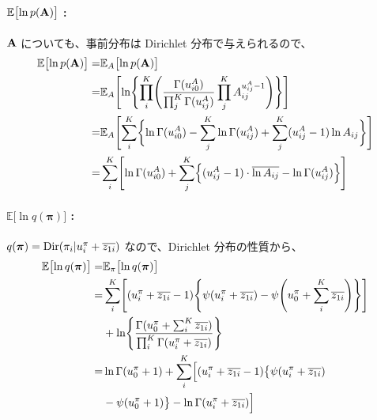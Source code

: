 \paragraph{ $\mathbb{E}\bigl[\ln p({\bf A}) \bigr]$ : }
${\bf A}$ についても、事前分布は Dirichlet 分布で与えられるので、
\begin{align}
  \mathbb{E}\bigl[\ln p({\bf A}) \bigr]  =&  \mathbb{E}_{A}\bigl[ \ln p({\bf A}) \bigr]  \\
  =&  \mathbb{E}_{A}\Biggl[ \ln \Biggl\{ \prod_i^K \Biggl( \frac{\Gamma(u_{i0}^A)}{ \prod_j^K \Gamma(u_{ij}^A)} \prod_j^K A_{ij}^{u_{ij}^A - 1} \Biggr) \Biggr\} \Biggr]  \\
  =&  \mathbb{E}_{A}\Biggl[ \sum_i^K \biggl\{ \ln\Gamma(u_{i0}^A) - \sum_j^K \ln\Gamma(u_{ij}^A) + \sum_j^K (u_{ij}^A - 1) \ln A_{ij} \biggr\} \Biggr]  \\
  =&  \sum_i^K \Biggl[ \ln\Gamma(u_{i0}^A) + \sum_j^K \Bigl\{ (u_{ij}^A - 1) \cdot \overline{\ln A_{ij}} - \ln\Gamma(u_{ij}^A) \Bigr\} \Biggr]  \label{eqn:expLnPA}
\end{align}

\paragraph{ $\mathbb{E}\bigl[\ln q({\boldsymbol \pi}) \bigr]$ : }
$q({\boldsymbol \pi}) = {\rm Dir}(\pi_i|u_i^\pi + \overline{z_{1i}})$ なので、Dirichlet  分布の性質から、
\begin{align}
  \mathbb{E}\bigl[\ln q({\boldsymbol \pi}) \bigr]  =&  \mathbb{E}_{\pi}\bigl[ \ln q({\boldsymbol \pi}) \bigr]  \\
%
  =&  \sum_i^K \Biggl[ (u_i^\pi + \overline{z_{1i}} - 1) \Biggl\{ \psi(u_i^\pi + \overline{z_{1i}}) - \psi\Biggl(u_0^\pi + \sum_i^K \overline{z_{1i}}\Biggr) \Biggr\} \Biggr]  \notag  \\  
    &  + \ln \Biggl\{ \frac{ \Gamma(u_0^\pi + \sum_i^K \overline{z_{1i}}) }{ \prod_i^K \Gamma(u_i^\pi + \overline{z_{1i}}) } \Biggr\}  \\
%
  =& \ln \Gamma(u_0^\pi + 1) + \sum_i^K \Bigl[ (u_i^\pi + \overline{z_{1i}} - 1) \bigl\{ \psi(u_i^\pi + \overline{z_{1i}})  \notag  \\  
    &   - \psi(u_0^\pi + 1) \bigr\} - \ln \Gamma(u_i^\pi + \overline{z_{1i}}) \Bigr]  \label{eqn:expLnQPi}
\end{align}

